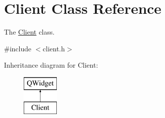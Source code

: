 \hypertarget{class_client}{}\section{Client Class Reference}
\label{class_client}


The \hyperlink{class_client}{Client} class.  




{\ttfamily \#include $<$client.\+h$>$}

Inheritance diagram for Client\+:\begin{figure}[H]
\begin{center}
\leavevmode
\includegraphics[height=2.000000cm]{class_client}
\end{center}
\end{figure}

